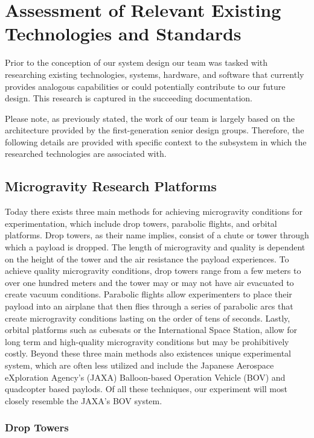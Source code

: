 \section{Assessment of Relevant Existing Technologies and Standards}

\indent\indent Prior to the conception of our system design our team was tasked with researching existing technologies, systems, hardware, and software that currently provides analogous capabilities or could potentially contribute to our future design. This research is captured in the succeeding documentation. 

Please note, as previously stated, the work of our team is largely based on the architecture provided by the first-generation senior design groups. Therefore, the following details are provided with specific context to the subsystem in which the researched technologies are associated with. 

\subsection{Microgravity Research Platforms}

\indent\indent Today there exists three main methods for achieving microgravity conditions for experimentation, which include drop towers, parabolic flights, and orbital platforms. Drop towers, as their name implies, consist of a chute or tower through which a payload is dropped. The length of microgravity and quality is dependent on the height of the tower and the air resistance the payload experiences. To achieve quality microgravity conditions, drop towers range from a few meters to over one hundred meters and the tower may or may not have air evacuated to create vacuum conditions. Parabolic flights allow experimenters to place their payload into an airplane that then flies through a series of parabolic arcs that create microgravity conditions lasting on the order of tens of seconds. Lastly, orbital platforms such as cubesats or the International Space Station, allow for long term and high-quality microgravity conditions but may be prohibitively costly. Beyond these three main methods also existences unique experimental system, which are often less utilized and include the Japanese Aerospace eXploration Agency’s (JAXA) Balloon-based Operation Vehicle (BOV) and quadcopter based paylods. Of all these techniques, our experiment will most closely resemble the JAXA’s BOV system.

\subsubsection{Drop Towers}

